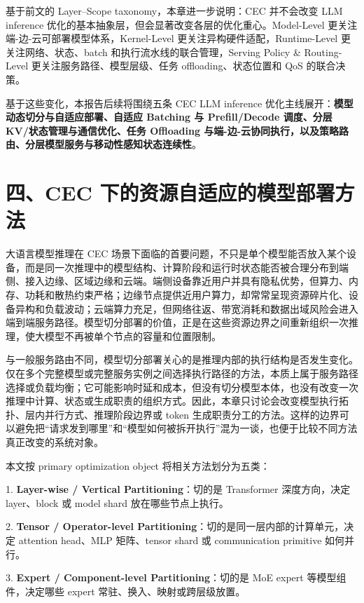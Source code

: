 \documentclass[a4paper,twocolumn,10pt]{ctexart}
\begin{document}
基于前文的 Layer–Scope taxonomy，本章进一步说明：CEC 并不会改变 LLM inference 优化的基本抽象层，但会显著改变各层的优化重心。Model-Level 更关注端-边-云可部署模型体系，Kernel-Level 更关注异构硬件适配，Runtime-Level 更关注网络、状态、batch 和执行流水线的联合管理，Serving Policy \& Routing-Level 更关注服务路径、模型层级、任务 offloading、状态位置和 QoS 的联合决策。




基于这些变化，本报告后续将围绕五条 CEC LLM inference 优化主线展开：\textbf{模型动态切分与自适应部署、自适应 Batching 与 Prefill/Decode 调度、分层 KV/状态管理与通信优化、任务 Offloading 与端-边-云协同执行，以及策略路由、分层模型服务与移动性感知状态连续性}。


\section{四、CEC 下的资源自适应的模型部署方法}

大语言模型推理在 CEC 场景下面临的首要问题，不只是单个模型能否放入某个设备，而是同一次推理中的模型结构、计算阶段和运行时状态能否被合理分布到端侧、接入边缘、区域边缘和云端。端侧设备靠近用户并具有隐私优势，但算力、内存、功耗和散热约束严格；边缘节点提供近用户算力，却常常呈现资源碎片化、设备异构和负载波动；云端算力充足，但网络往返、带宽消耗和数据出域风险会进入端到端服务路径。模型切分部署的价值，正是在这些资源边界之间重新组织一次推理，使大模型不再被单个节点的容量和位置限制。


与一般服务路由不同，模型切分部署关心的是推理内部的执行结构是否发生变化。仅在多个完整模型或完整服务实例之间选择执行路径的方法，本质上属于服务路径选择或负载均衡；它可能影响时延和成本，但没有切分模型本体，也没有改变一次推理中计算、状态或生成职责的组织方式。因此，本章只讨论会改变模型执行拓扑、层内并行方式、推理阶段边界或 token 生成职责分工的方法。这样的边界可以避免把“请求发到哪里”和“模型如何被拆开执行”混为一谈，也便于比较不同方法真正改变的系统对象。


本文按 primary optimization object 将相关方法划分为五类：


1. \textbf{Layer-wise / Vertical Partitioning}：切的是 Transformer 深度方向，决定 layer、block 或 model shard 放在哪些节点上执行。


2. \textbf{Tensor / Operator-level Partitioning}：切的是同一层内部的计算单元，决定 attention head、MLP 矩阵、tensor shard 或 communication primitive 如何并行。


3. \textbf{Expert / Component-level Partitioning}：切的是 MoE expert 等模型组件，决定哪些 expert 常驻、换入、映射或跨层级放置。
\end{document}
